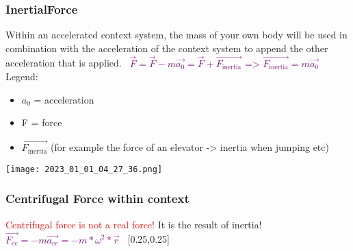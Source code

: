 \documentclass[main.tex,fontsize=8pt,paper=a4,paper=portrait,DIV=calc,]{scrartcl}
\begin{document}
\begin{multicols*}{2}
\subsubsection{InertialForce}
Within an accelerated context system, the mass of your own body will be used in combination with the acceleration of the context system to append the other acceleration that is applied.
\, \newline
\large \textcolor{purple}{\( \vec{F} = \vec{F} - m\vec{a_0} = \vec{F} + \vec{F_{\text{inertia}}} \text{ => } \vec{F_{\text{inertia}}} = m\vec{a_0} \)}\newline
\, \newline
\normalsize Legend: \newline
\begin{itemize}
\item \(a_0\) = acceleration
\item F = force
\item \(\vec{F_{\text{inertia}}}\) (for example the force of an elevator -> inertia when jumping etc) 
\end{itemize} 
\texttt{[image: 2023\_01\_01\_04\_27\_36.png]}

\subsubsection{Centrifugal Force within context}
\textcolor{red}{Centrifugal force is not a real force!}\newline
It is the result of inertia!\newline
\, \newline
\large \textcolor{purple}{\( \vec{F_{ce}} = -m\vec{a_{ce}} = -m * \omega^2 * \vec{r} \)}\newline
\, \newline
\normalsize 
{}[0.25,0.25]


\end{multicols*}
\end{document}
